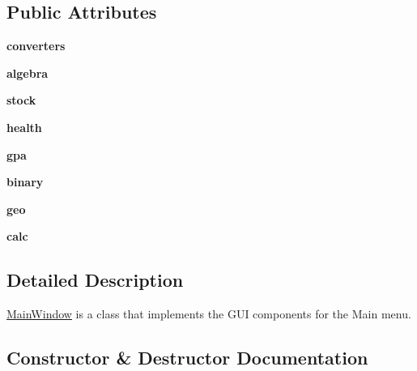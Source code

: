 \subsection*{Public Attributes}
\begin{DoxyCompactItemize}
\item 
\mbox{\label{classmain_1_1_main_window_ac90d4b9676d67b44447d3966a32d6417}} 
{\bfseries converters}
\item 
\mbox{\label{classmain_1_1_main_window_af9037d5b34cba2897b6f89da74e1a95b}} 
{\bfseries algebra}
\item 
\mbox{\label{classmain_1_1_main_window_a584935749a42b7c6f5921beec9a5c100}} 
{\bfseries stock}
\item 
\mbox{\label{classmain_1_1_main_window_aa6fae6477bf0cabf3e447cdb3a293511}} 
{\bfseries health}
\item 
\mbox{\label{classmain_1_1_main_window_a6da9e1bb50231a1bcb4ec434dfdc014a}} 
{\bfseries gpa}
\item 
\mbox{\label{classmain_1_1_main_window_abf63e5a9f6e37d9467383efacf218f01}} 
{\bfseries binary}
\item 
\mbox{\label{classmain_1_1_main_window_a838d54d37bed052ff6264f642d7527f7}} 
{\bfseries geo}
\item 
\mbox{\label{classmain_1_1_main_window_aabad3594b4de0127995ff88be8e8f78f}} 
{\bfseries calc}
\end{DoxyCompactItemize}


\subsection{Detailed Description}
\hyperlink{classmain_1_1_main_window}{Main\+Window} is a class that implements the G\+UI components for the Main menu. 

\subsection{Constructor \& Destructor Documentation}
\mbox{\label{classmain_1_1_main_window_aafffd1d8e8955b1e04e531ad7f534b69}} 
